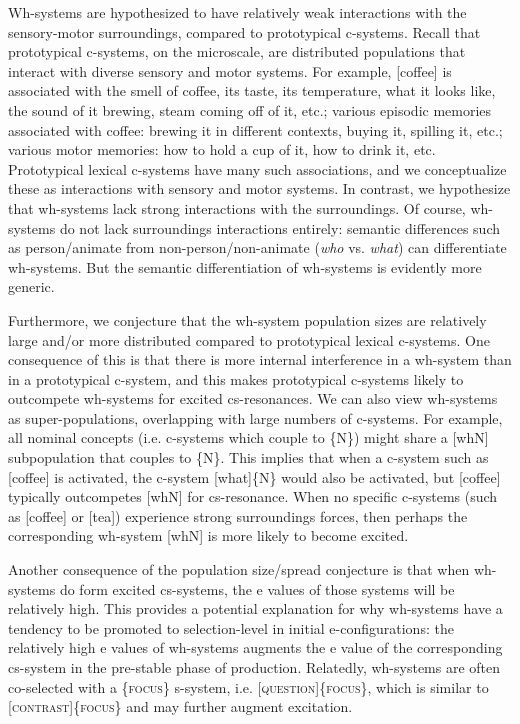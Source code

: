   Wh-systems are hypothesized to have relatively weak interactions with the sensory-motor surroundings, compared to prototypical c-systems. Recall that prototypical c-systems, on the microscale, are distributed populations that interact with diverse sensory and motor systems. For example, [coffee] is associated with the smell of coffee, its taste, its temperature, what it looks like, the sound of it brewing, steam coming off of it, etc.; various episodic memories associated with coffee: brewing it in different contexts, buying it, spilling it, etc.; various motor memories: how to hold a cup of it, how to drink it, etc. Prototypical lexical c-systems have many such associations, and we conceptualize these as interactions with sensory and motor systems. In contrast, we hypothesize that wh-systems lack strong interactions with the surroundings. Of course, wh-systems do not lack surroundings interactions entirely: semantic differences such as person/animate from non-person/non-animate (\textit{who} vs. \textit{what}) can differentiate wh-systems. But the semantic differentiation of wh-systems is evidently more generic.

  Furthermore, we conjecture that the wh-system population sizes are relatively large and/or more distributed compared to prototypical lexical c-systems. One consequence of this is that there is more internal interference in a wh-system than in a prototypical c-system, and this makes prototypical c-systems likely to outcompete wh-systems for excited cs-resonances. We can also view wh-systems as super-populations, overlapping with large numbers of c-systems. For example, all nominal concepts (i.e. c-systems which couple to \{N\}) might share a [whN] subpopulation that couples to \{N\}. This implies that when a c-system such as [coffee] is activated, the c-system [what]\{N\} would also be activated, but [coffee] typically outcompetes [whN] for cs-resonance. When no specific c-systems (such as [coffee] or [tea]) experience strong surroundings forces, then perhaps the corresponding wh-system [whN] is more likely to become excited.

  Another consequence of the population size/spread conjecture is that when wh-systems do form excited cs-systems, the e values of those systems will be relatively high. This provides a potential explanation for why wh-systems have a tendency to be promoted to selection-level in initial e-configurations: the relatively high e values of wh-systems augments the e value of the corresponding cs-system in the pre-stable phase of production. Relatedly, wh-systems are often co-selected with a \{\textsc{focus}\} s-system, i.e. [\textsc{question}]\{\textsc{focus}\}, which is similar to [\textsc{contrast}]\{\textsc{focus}\} and may further augment excitation.

